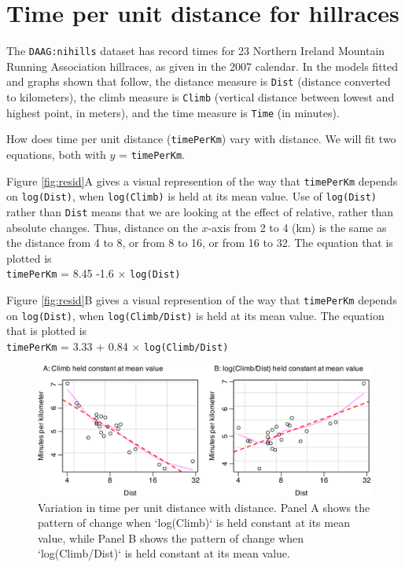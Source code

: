 \documentclass[
  10pt,
  b5paper]{book}
\begin{document}
\hypertarget{time-per-unit-distance-for-hillraces}{%
\section{Time per unit distance for hillraces}\label{time-per-unit-distance-for-hillraces}}

The \texttt{DAAG:nihills} dataset has record times for 23 Northern Ireland
Mountain Running Association hillraces, as given in the 2007
calendar. In the models fitted and graphs shown that follow,
the distance measure is \texttt{Dist} (distance converted to kilometers),
the climb measure is \texttt{Climb} (vertical distance between lowest
and highest point, in meters), and the time measure is \texttt{Time}
(in minutes).

How does time per unit distance (\texttt{timePerKm}) vary with distance.
We will fit two equations, both with \(y\) = \texttt{timePerKm}.

Figure \ref{fig:resid}A gives a visual represention of the
way that \texttt{timePerKm} depends on \texttt{log(Dist)}, when \texttt{log(Climb)}
is held at its mean value. Use of \texttt{log(Dist)} rather than
\texttt{Dist} means that we are looking at the effect of relative,
rather than absolute changes. Thus, distance on the \(x\)-axis
from 2 to 4 (km) is the same as the distance from 4 to 8, or
from 8 to 16, or from 16 to 32. The equation that is plotted
is\\
\texttt{timePerKm} = 8.45 -1.6 \(\times\) \texttt{log(Dist)}

Figure \ref{fig:resid}B gives a visual represention of the
way that \texttt{timePerKm} depends on \texttt{log(Dist)}, when \texttt{log(Climb/Dist)}
is held at its mean value. The equation that is plotted
is\\
\texttt{timePerKm} = 3.33 + 0.84 \(\times\) \texttt{log(Climb/Dist)}

\begin{figure}[H]

{\centering \includegraphics[width=1\linewidth]{08-observational_files/figure-latex/partial-1} 

}

\caption{Variation in time per unit distance with distance.  Panel A
shows the pattern of change when `log(Climb)` is held constant at its 
mean value, while Panel B shows the pattern of change when 
`log(Climb/Dist)` is held constant at its mean value.}\label{fig:partial}
\end{figure}
\end{document}
